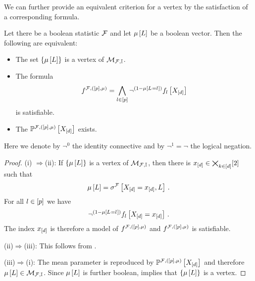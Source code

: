 We can further provide an equivalent criterion for a vertex by the satisfaction of a corresponding formula.

\begin{theorem}
    Let there be a boolean statistic $\mathcal{F}$ and let $\mu\left[L\right]$ be a boolean vector.
    Then the following are equivalent:
    \begin{itemize}
        \item[(i)] The set $\{\mu\left[L\right]\}$ is a vertex of $\mathcal{M}_{\mathcal{F},\mathbb{I}}$.
        \item[(ii)] The formula
        \begin{align*}
            f^{\mathcal{F},([p],\mu)} = \bigwedge_{l\in[p]} \lnot^{(1-\mu\left[L_{}=l_{}\right])} f_{l}\left[X_{[d]}\right]
        \end{align*}
        is satisfiable.
        \item[(iii)] The \HardLogicNetwork{} $\mathbb{P}^{\mathcal{F},([p],\mu)}\left[X_{[d]}\right]$ exists. %
    \end{itemize}
    Here we denote by $\lnot^0$ the identity connective and by $\lnot^1=\lnot$ the logical negation.
\end{theorem}
\begin{proof}
(i)
    $\Rightarrow$(ii):
    If $\{\mu\left[L\right]\}$ is a vertex of $\mathcal{M}_{\mathcal{F},\mathbb{I}}$, then there is $x_{[d]}\in\bigtimes_{k\in[d]}[2]$ such that %
    \begin{align*}
        \mu\left[L\right] = \sigma^{\mathcal{F}}\left[X_{[d]}=x_{[d]},L\right] \, .
    \end{align*}
    For all $l\in[p]$ we have
    \begin{align*}
        \lnot^{(1-\mu\left[L_{}=l_{}\right])}f_{l}\left[X_{[d]}=x_{[d]}\right] \, .
    \end{align*}
    The index $x_{[d]}$ is therefore a model of $f^{\mathcal{F},([p],\mu)}$ and $f^{\mathcal{F},([p],\mu)}$ is satisfiable.

    (ii)$\Rightarrow$(iii):
    This follows from .

    (iii)$\Rightarrow$(i):
    The mean parameter is reproduced by $\mathbb{P}^{\mathcal{F},([p],\mu)}\left[X_{[d]}\right]$ and therefore $\mu\left[L\right]\in\mathcal{M}_{\mathcal{F},\mathbb{I}}$.
    Since $\mu\left[L\right]$ is further boolean,  implies that $\{\mu\left[L\right]\}$ is a vertex.
\end{proof}


